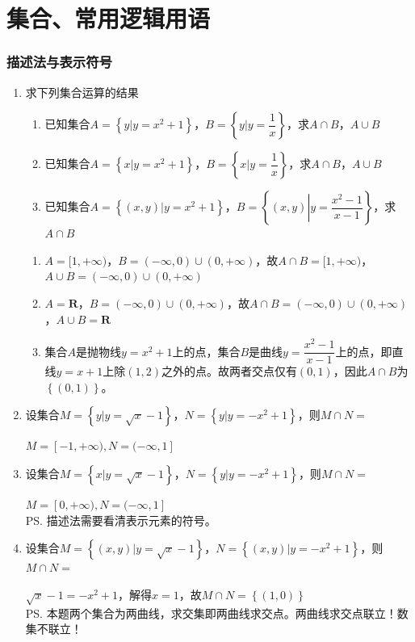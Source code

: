 \chapter*{集合、常用逻辑用语}
\subsection*{描述法与表示符号}
\begin{enumerate}
    \item 求下列集合运算的结果
        \begin{enumerate}
            \item 已知集合$A = \left\{y | y = x^2+1\right\}$，$B = \left\{y | y = \dfrac{1}{x}\right\}$，求$A \cap B$，$A \cup B$
            \item 已知集合$A = \left\{x | y = x^2+1\right\}$，$B = \left\{x | y = \dfrac{1}{x}\right\}$，求$A \cap B$，$A \cup B$
            \item 已知集合$A = \left\{(x, y) | y = x^2+1\right\}$，$B = \left\{(x, y) \left| y = \dfrac{x^2-1}{x-1}\right. \right\}$，求$A \cap B$
        \end{enumerate}
        \begin{jieda}
            \begin{enumerate}
                \item $A = [1, +\infty)$，$B = (-\infty, 0) \cup (0, +\infty)$，故$A \cap B = [1, +\infty)$，$A \cup B = (-\infty, 0) \cup (0, +\infty)$
                \item $A = \mathbf{R}$，$B = (-\infty, 0) \cup (0, +\infty)$，故$A \cap B = (-\infty, 0) \cup (0, +\infty)$，$A \cup B = \mathbf{R}$
                \item 集合$A$是抛物线$y = x^2+1$上的点，集合$B$是曲线$y = \dfrac{x^2-1}{x-1}$上的点，即直线$y = x+1$上除$(1,2)$之外的点。故两者交点仅有$(0, 1)$，因此$A \cap B$为$\left\{(0,1)\right\}$。
            \end{enumerate}
        \end{jieda}
    \item 设集合$M = \left\{y | y = \sqrt{x} - 1 \right\}， N = \left\{y | y = -x^2+1 \right\}$，则$M \cap N = $\blkda{$[-1, 1]$}
    \begin{jieda}
        $M = [-1, +\infty), N = (-\infty, 1]$
    \end{jieda}      
    \item 设集合$M = \left\{x | y = \sqrt{x} - 1 \right\}， N = \left\{y | y = -x^2+1 \right\}$，则$M \cap N = $\blkda{$[0, 1]$}
    \begin{jieda}
        $M = [0, +\infty), N = (-\infty, 1]$ \\
        \ps 描述法需要看清表示元素的符号。
    \end{jieda}
    \item 设集合$M = \left\{(x, y) | y = \sqrt{x} - 1 \right\}， N = \left\{(x, y) | y = -x^2+1 \right\}$，则$M \cap N = $
    \begin{jieda}
        $\sqrt{x} - 1 = -x^2+1$，解得$x = 1$，故$M \cap N = \left\{(1, 0)\right\}$ \\
        \ps 本题两个集合为两曲线，求交集即两曲线求交点。两曲线求交点联立！数集不联立！
    \end{jieda}
\end{enumerate}

